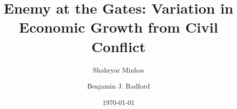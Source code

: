 \documentclass[12pt,onesided]{amsart}
\title[Enemy at the Gates]{Enemy at the Gates: Variation in Economic Growth from Civil Conflict}
\date{\today}
\author[Minhas]{Shahryar Minhas}
\author[Radford]{Benjamin J. Radford}
\begin{document}
\maketitle

\begin{abstract}
\singlespacing

\end{abstract}

\newpage
\newpage\setcounter{page}{1} 



\newpage

%  


\end{document}
